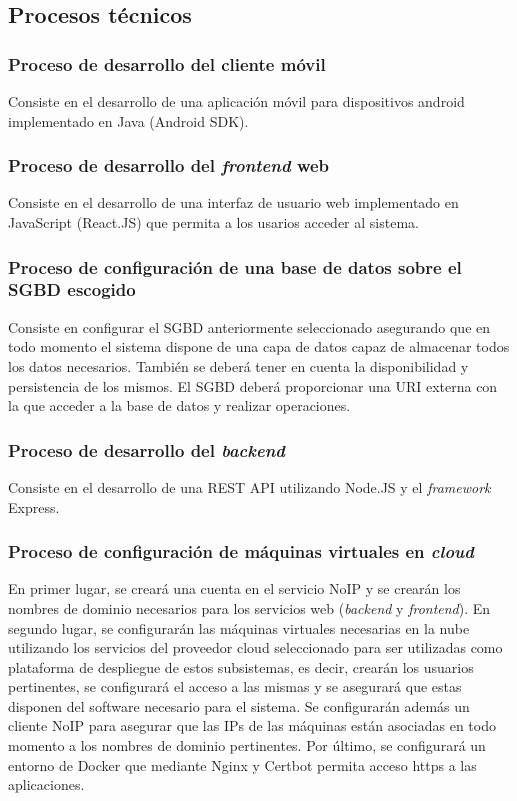 \documentclass{article}
\begin{document}
\subsection{Procesos técnicos}

\subsubsection{Proceso de desarrollo del cliente móvil} \label{P.T.1}
Consiste en el desarrollo de una aplicación móvil para dispositivos android implementado en Java (Android SDK).

\subsubsection{Proceso de desarrollo del \textit{frontend} web } \label{P.T.2}
Consiste en el desarrollo de una interfaz de usuario web implementado en JavaScript (React.JS) que permita a los usarios acceder al sistema.

\subsubsection{Proceso de configuración de una base de datos sobre el SGBD escogido} \label{P.T.3}
Consiste en configurar el SGBD anteriormente seleccionado asegurando que en todo momento el sistema dispone de una capa de datos capaz de almacenar todos los datos necesarios. También se deberá tener en cuenta la disponibilidad y persistencia de los mismos. El SGBD deberá proporcionar una URI externa con la que acceder a la base de datos y realizar operaciones.

\subsubsection{Proceso de desarrollo del \textit{backend}} \label{P.T.4}
Consiste en el desarrollo de una REST API utilizando Node.JS y el \textit{framework} Express.

\subsubsection{Proceso de configuración de máquinas virtuales en \textit{cloud}} \label{P.T.5}

En primer lugar, se creará una cuenta en el servicio NoIP y se crearán los nombres de dominio necesarios para los servicios web (\textit{backend} y \textit{frontend}). En segundo lugar, se configurarán las máquinas virtuales necesarias en la nube utilizando los servicios del proveedor cloud seleccionado para ser utilizadas como plataforma de despliegue de estos subsistemas, es decir, crearán los usuarios pertinentes, se configurará el acceso a las mismas y se asegurará que estas disponen del software necesario para el sistema. Se configurarán además un cliente NoIP para asegurar que las IPs de las máquinas están asociadas en todo momento a los nombres de dominio pertinentes. Por último, se configurará un entorno de Docker que mediante Nginx y Certbot permita acceso https a las aplicaciones. 
\end{document}
